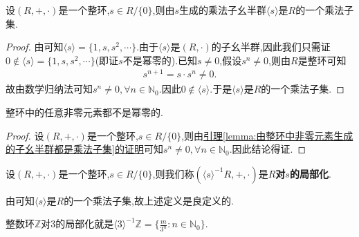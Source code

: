 \documentclass[../../main.tex]{subfiles}
\begin{document}
\begin{lemma}\label{lemma:由整环中非零元素生成的子幺半群都是乘法子集}
设$(R,+,\cdot)$是一个整环,$s\in R/\{0\}$,则由$s$生成的乘法子幺半群$\langle s\rangle$是$R$的一个乘法子集.
\end{lemma}
\begin{proof}
由可知$\langle s \rangle=\{1,s,s^2,\cdots\}$.由于$\langle s\rangle$是$(R,\cdot)$的子幺半群,因此我们只需证$0\notin \langle s \rangle=\{1,s,s^2,\cdots\}$(即证$s$不是幂零的).已知$s\ne 0$,假设$s^n\ne 0$,则由$R$是整环可知
\begin{align*}
s^{n+1}=s\cdot s^n\ne 0.
\end{align*}
故由数学归纳法可知$s^n\ne 0 ,\forall n\in \mathbb{N}_0$.因此$0\notin \langle s \rangle$.于是$\langle s\rangle$是$R$的一个乘法子集.
\end{proof}

\begin{corollary}
整环中的任意非零元素都不是幂零的.
\end{corollary}
\begin{proof}
设$(R,+,\cdot)$是一个整环,$s\in R/\{0\}$,则由\hyperref[lemma:由整环中非零元素生成的子幺半群都是乘法子集]{引理\ref{lemma:由整环中非零元素生成的子幺半群都是乘法子集}的证明}可知$s^n\ne 0 ,\forall n\in \mathbb{N}_0$.因此结论得证.
\end{proof}

\begin{definition}
设$(R,+,\cdot)$是一个整环,$s\in R/\{0\}$,则我们称$(\langle s \rangle^{-1}R,+,\cdot)$是\textbf{$R$对$s$的局部化}.
\end{definition}
\begin{remark}
由可知$\langle s \rangle$是$R$的一个乘法子集,故上述定义是良定义的.
\end{remark}
\begin{note}
整数环$\mathbb{Z}$对$3$的局部化就是$\langle 3\rangle^{-1}\mathbb{Z}=\{\frac{m}{3^n}:n\in \mathbb{N}_0\}.$
\end{note}
\end{document}
